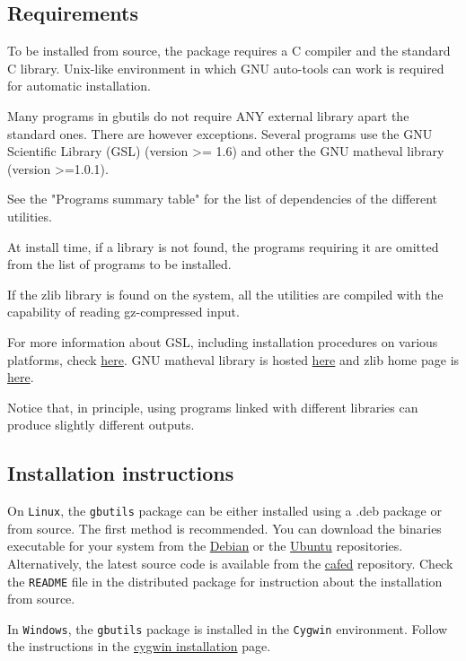 \documentclass[11pt]{article}
\begin{document}
\subsection{Requirements}
\label{sec-1-1}

To be installed from source, the package requires a C compiler and the
standard C library. Unix-like environment in which GNU auto-tools can
work is required for automatic installation.

Many programs in gbutils do not require ANY external library apart the
standard ones. There are however exceptions. Several programs use the
GNU Scientific Library (GSL) (version >= 1.6) and other the GNU
matheval library (version >=1.0.1).

See the "Programs summary table" for the list of dependencies of the
different utilities.

At install time, if a library is not found, the programs requiring it
are omitted from the list of programs to be installed.

If the zlib library is found on the system, all the utilities are
compiled with the capability of reading gz-compressed input.

For more information about GSL, including installation procedures on
various platforms, check \href{http://www.gnu.org/software/gsl/}{here}.  GNU matheval library is hosted \href{http://savannah.gnu.org}{here}
and zlib home page is \href{http://www.gzip.org/zlib/}{here}.

Notice that, in principle, using programs linked with different
libraries can produce slightly different outputs.
\subsection{Installation instructions}
\label{sec-1-2}

On \texttt{Linux}, the \texttt{gbutils} package can be either installed using a .deb
package or from source. The first method is recommended. You can
download the binaries executable for your system from the \href{https://packages.debian.org/unstable/main/gbutils}{Debian} or
the \href{http://packages.ubuntu.com/wily/gbutils}{Ubuntu} repositories. Alternatively, the latest source code is
available from the \href{ftp://cafed.sssup.it/packages/}{cafed} repository. Check the \verb~README~ file in the
distributed package for instruction about the installation from
source.

In \texttt{Windows}, the \texttt{gbutils} package is installed in the \texttt{Cygwin}
environment. Follow the instructions in the \href{http://cafim.sssup.it/~giulio/software/gbutils/cygwin_install.html}{cygwin installation} page.
\end{document}
